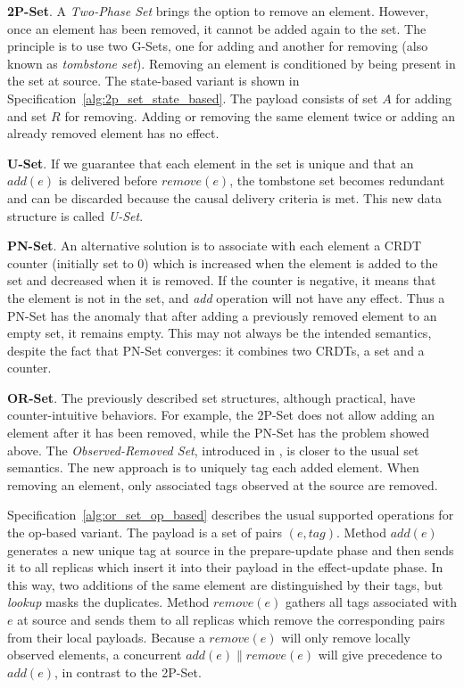 \textbf{2P-Set}. A \textit{Two-Phase Set} brings the option to remove an
element. However, once an element has been removed, it cannot be added again to
the set. The principle is to use two G-Sets, one for adding and another for
removing (also known as \textit{tombstone set}). Removing an element is
conditioned by being present in the set at source. The state-based variant is
shown in Specification~\ref{alg:2p_set_state_based}. The payload consists of set
$A$ for adding and set $R$ for removing. Adding or removing the same element
twice or adding an already removed element has no effect.

\textbf{U-Set}. If we guarantee that each element in the set is unique and that
an $\textit{add}(e)$ is delivered before $\textit{remove}(e)$, the tombstone set
becomes redundant and can be discarded because the causal delivery criteria
is met. This new data structure is called \textit{U-Set}.

\textbf{PN-Set}. An alternative solution is to associate with each element a
CRDT counter (initially set to 0) which is increased when the element is added
to the set and decreased when it is removed. If the counter is negative, it
means that the element is not in the set, and \textit{add} operation will not
have any effect. Thus a PN-Set has the anomaly that after adding a previously
removed element to an empty set, it remains empty. This may not always be the
intended semantics, despite the fact that PN-Set converges: it combines two
CRDTs, a set and a counter.

\textbf{OR-Set}. The previously described set structures, although practical,
have counter-intuitive behaviors. For example, the 2P-Set does not allow adding
an element after it has been removed, while the PN-Set has the problem showed
above. The \textit{Observed-Removed Set}, introduced in
\cite{shapiro:inria-00555588}, is closer to the usual set semantics. The new
approach is to uniquely tag each added element. When removing an element, only
associated tags observed at the source are removed.

Specification~\ref{alg:or_set_op_based} describes the usual supported operations
for the op-based variant. The payload is a set of pairs
$(\textit{e},\textit{tag})$. Method $\textit{add}(e)$ generates a new unique tag
at source in the prepare-update phase and then sends it to all replicas which
insert it into their payload in the effect-update phase. In this way, two
additions of the same element are distinguished by their tags, but
\textit{lookup} masks the duplicates. Method $\textit{remove}(e)$ gathers all
tags associated with $e$ at source and sends them to all replicas which remove
the corresponding pairs from their local payloads. Because a
$\textit{remove}(e)$ will only remove locally observed elements, a concurrent
$\textit{add}(e) \parallel \textit{remove}(e)$ will give precedence to
$\textit{add}(e)$, in contrast to the 2P-Set.

